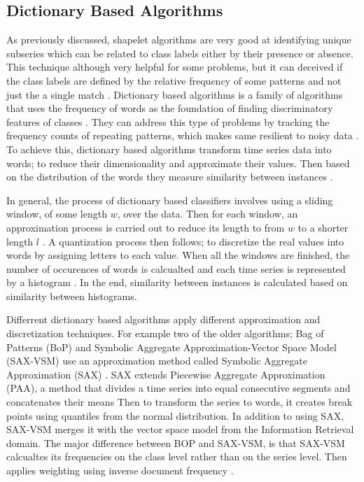 \subsection{Dictionary Based Algorithms}
\label{SubsectionDictionary}
As previously discussed, shapelet algorithms are very good at identifying unique subseries which can be related to class labels either by their presence or absence.
This technique although very helpful for some problems, but it can deceived if the class labels are defined by the relative frequency of some patterns and not just the a single match \cite{large2018bop,bagnall2017great}.
Dictionary based algorithms is a family of algorithms that uses the frequency of words as the foundation of finding discriminatory features of classes \cite{middlehurst2019scalable}.
They can address this type of problems by tracking the frequency counts of repeating patterns, which makes same resilient to noisy data \cite{shifaz2020ts}.
To achieve this, dictionary based algorithms transform time series data into words; to reduce their dimensionality and approximate their values.
Then based on the distribution of the words they measure similarity between instances \cite{lin2012rotation,schafer2015boss}.

In general, the process of dictionary based classifiers involves using a sliding window, of some length $w$, over the data.
Then for each window, an approximation process is carried out to reduce its length to from $w$ to a shorter length $l$ \cite{bagnall2020tale}.
A quantization process then follows; to discretize the real values into words by assigning letters to each value.
When all the windows are finished, the number of occurences of words is calcualted and each time series is represented by a histogram \cite{shifaz2020ts}.
In the end, similarity between instances is calculated based on similarity between histograms.

Differrent dictionary based algorithms apply different approximation and discretization techniques.
For example two of the older algorithms; Bag of Patterns (BoP) \cite{lin2012rotation} and Symbolic Aggregate Approximation-Vector Space Model (SAX-VSM) \cite{senin2013sax}
use an approximation method called Symbolic Aggregate Approximation (SAX) \cite{lin2007experiencing}.
SAX extends Piecewise Aggregate Approximation (PAA), a method that divides a time series into equal consecutive segments and concatenates their means \cite{shifaz2020ts}
Then to transform the series to words, it creates break points using quantiles from the normal distribution.
In addition to using SAX, SAX-VSM merges it with the vector space model from the Information Retrieval domain.
The major difference between BOP and SAX-VSM, is that SAX-VSM calcualtes its frequencies on the class level rather than on the series level.
Then applies weighting using inverse document frequency \cite{bagnall2017great}.


